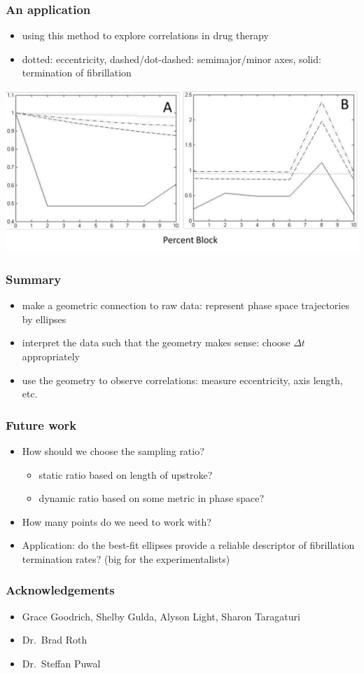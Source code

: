 \documentclass{beamer}
\begin{document}
	\begin{frame}
		\frametitle{An application}
		\begin{itemize}
			\item using this method to explore correlations in drug therapy
			\item dotted: eccentricity, dashed/dot-dashed: semimajor/minor axes, solid: termination of fibrillation 
		\end{itemize}
	\includegraphics[scale=0.25]{data.png}
		
	\end{frame}

	\begin{frame}
		\frametitle{Summary}
		\begin{itemize}
			\item make a geometric connection to raw data: represent phase space trajectories by ellipses
			\item interpret the data such that the geometry makes sense: choose $\Delta t$ appropriately
			\item use the geometry to observe correlations: measure eccentricity, axis length, etc.
		\end{itemize}
	\end{frame}

	\begin{frame}
		\frametitle{Future work}
		\begin{itemize}
			\item How should we choose the sampling ratio?
			\begin{itemize}
				\item static ratio based on length of upstroke?
				\item dynamic ratio based on some metric in phase space?
			\end{itemize}
			\item How many points do we need to work with?
			\item Application: do the best-fit ellipses provide a reliable descriptor of fibrillation termination rates? (big for the experimentalists)
		\end{itemize}
	
	\end{frame}

	\begin{frame}
		\frametitle{Acknowledgements}
		\begin{itemize}
			\item Grace Goodrich, Shelby Gulda, Alyson Light, Sharon Taragaturi
			\item Dr.\ Brad Roth
			\item Dr.\ Steffan Puwal
		\end{itemize}
	\end{frame}

	
\end{document}
